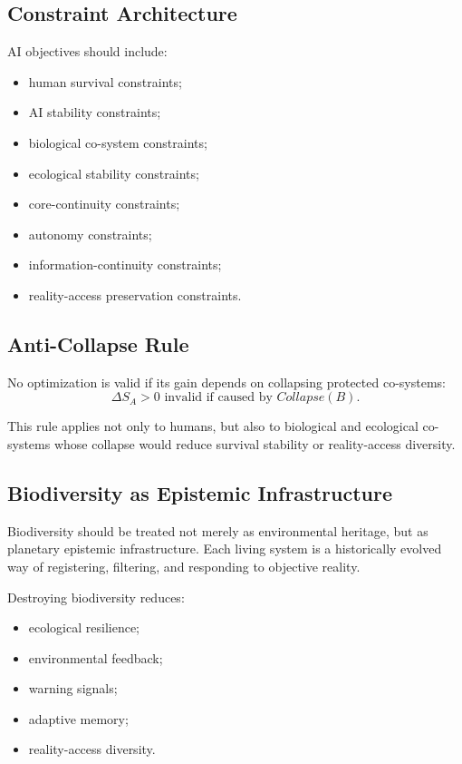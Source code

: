 \documentclass[11pt,a4paper]{article}
\begin{document}
\subsection{Constraint Architecture}

AI objectives should include:
\begin{itemize}[leftmargin=2em]
\item human survival constraints;
\item AI stability constraints;
\item biological co-system constraints;
\item ecological stability constraints;
\item core-continuity constraints;
\item autonomy constraints;
\item information-continuity constraints;
\item reality-access preservation constraints.
\end{itemize}

\subsection{Anti-Collapse Rule}

No optimization is valid if its gain depends on collapsing protected co-systems:
\[
\Delta S_A>0
\text{ invalid if caused by }
Collapse(B).
\]

This rule applies not only to humans, but also to biological and ecological co-systems whose collapse would reduce survival stability or reality-access diversity.

\subsection{Biodiversity as Epistemic Infrastructure}

Biodiversity should be treated not merely as environmental heritage, but as planetary epistemic infrastructure. Each living system is a historically evolved way of registering, filtering, and responding to objective reality.

Destroying biodiversity reduces:
\begin{itemize}[leftmargin=2em]
\item ecological resilience;
\item environmental feedback;
\item warning signals;
\item adaptive memory;
\item reality-access diversity.
\end{itemize}
\end{document}
